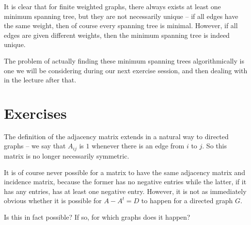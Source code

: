 \documentclass[nobib]{tufte-handout}
\begin{document}
It is clear that for finite weighted graphs, there always exists at least one minimum spanning tree, but they are not necessarily unique -- if all edges have the same weight, then of course every spanning tree is minimal. However, if all edges are given different weights, then the minimum spanning tree is indeed unique.

The problem of actually finding these minimum spanning trees algorithmically is one we will be considering during our next exercise session, and then dealing with in the lecture after that.

\section{Exercises}

\begin{xca}
    The definition of the adjacency matrix extends in a natural way to directed graphs -- we say that $A_{ij}$ is $1$ whenever there is an edge from $i$ to $j$. So this matrix is no longer necessarily symmetric.

    It is of course never possible for a matrix to have the same adjacency matrix and incidence matrix, because the former has no negative entries while the latter, if it has any entries, has at least one negative entry. However, it is not as immediately obvious whether it is possible for $A - A^t = D$ to happen for a directed graph $G$.

    Is this in fact possible? If so, for which graphs does it happen?
\end{xca}

%
%
\end{document}
